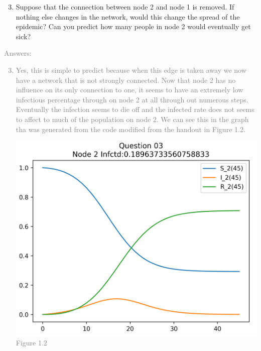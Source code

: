 \documentclass[11pt]{article}
\begin{document}
\begin{enumerate}
	\setcounter{enumi}{2}
	\item Suppose that the connection between node 2 and node 1 is removed. If nothing else changes in the network, would this change the spread of the epidemic? Can you predict how many people in node 2 would eventually get sick?
\end{enumerate}
\textcolor{gray}{
Answers:
\begin{enumerate}
	\setcounter{enumi}{2}
	\item Yes, this is simple to predict because when this edge is taken away we now have a network that is not strongly connected. Now that node 2 has no influence on its only connection to one, it seems to have an extremely low infectious percentage through on node 2 at all through out numerous steps.  Eventually the infection seems to die off and the infected rate does not seems to affect to much of the population on node 2.  We can see this in the graph tha was generated from the code modified from the handout in Figure 1.2.
\begin{center}
	\includegraphics[scale=0.8]{Figure1.2}\\
	Figure 1.2
\end{center}
\end{enumerate}
}
\end{document}
